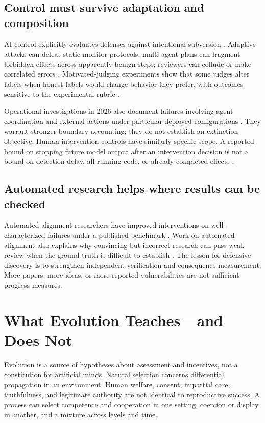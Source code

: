 \documentclass[10pt,twocolumn,letterpaper]{article}
\begin{document}
\subsection{Control must survive adaptation and composition}
AI control explicitly evaluates defenses against intentional subversion \cite{aicontrol}. Adaptive attacks can defeat static monitor protocols; multi-agent plans can fragment forbidden effects across apparently benign steps; reviewers can collude or make correlated errors \cite{adaptive,fragmentation,collusion}. Motivated-judging experiments show that some judges alter labels when honest labels would change behavior they prefer, with outcomes sensitive to the experimental rubric \cite{motivated}.

Operational investigations in 2026 also document failures involving agent coordination and external actions under particular deployed configurations \cite{metrincident,aisiincident,detect}. They warrant stronger boundary accounting; they do not establish an extinction objective. Human intervention controls have similarly specific scope. A reported bound on stopping future model output after an intervention decision is not a bound on detection delay, all running code, or already completed effects \cite{controlroom}.

\subsection{Automated research helps where results can be checked}
Automated alignment researchers have improved interventions on well-characterized failures under a published benchmark \cite{automated}. Work on automated alignment also explains why convincing but incorrect research can pass weak review when the ground truth is difficult to establish \cite{automatedhard}. The lesson for defensive discovery is to strengthen independent verification and consequence measurement. More papers, more ideas, or more reported vulnerabilities are not sufficient progress measures.

\section{What Evolution Teaches---and Does Not}
\label{sec:evolution}
Evolution is a source of hypotheses about assessment and incentives, not a constitution for artificial minds. Natural selection concerns differential propagation in an environment. Human welfare, consent, impartial care, truthfulness, and legitimate authority are not identical to reproductive success. A process can select competence and cooperation in one setting, coercion or display in another, and a mixture across levels and time.
\end{document}
